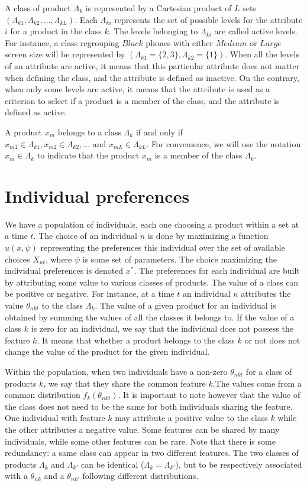 \documentclass[12pt]{article}
\begin{document}
A class of product $\Lambda_k$ is represented by a Cartesian product of $L$ sets $(\Lambda_{k1},\Lambda_{k2},\ldots,\Lambda_{kL})$. Each $\Lambda_{ki}$ represents the set of possible levels for the attribute $i$ for a product in the class $k$. The levels belonging to $\Lambda_{ki}$ are called active levels. For instance, a class regrouping $Black$ phones with either $Medium \text{ or } Large$ screen size will be represented by $(\Lambda_{k1}=\{2,3\},\Lambda_{k2}=\{1\})$. When all the levels of an attribute are active, it means that this particular attribute does not matter when defining the class, and the attribute is defined as inactive. On the contrary, when only some levels are active, it means that the attribute is used as a criterion to select if a product is a member of the class, and the attribute is defined as active.

A product $x_m$ belongs to a class $\Lambda_k$ if and only if $ x_{m1} \in \Lambda_{k1},x_{m2} \in \Lambda_{k2},\ldots \text{ and } x_{mL} \in \Lambda_{kL}$. For convenience, we will use the notation $x_{m} \in \Lambda_{k}$ to indicate that the product $x_{m}$ is a member of the class $\Lambda_{k}$.

\section{Individual preferences}

We have a population of individuals, each one choosing a product within a set at a time $t$. The choice of an individual $n$ is done by maximizing a function $u(x,\psi)$ representing the preferences this individual over the set of available choices $X_{nt}$, where $\psi$ is some set of parameters. The choice maximizing the individual preferences is denoted $x^*$. The preferences for each individual are built by attributing some value to various classes of products. The value of a class can be positive or negative. For instance, at a time $t$ an individual $n$ attributes the value $\theta_{nkt}$ to the class $\Lambda_k$. The value of a given product for an individual is obtained by summing the values of all the classes it belongs to. If the value of a class $k$ is zero for an individual, we say that the individual does not possess the feature $k$. It means that whether a product belongs to the class $k$ or not does not change the value of the product for the given individual.

Within the population, when two individuals have a non-zero $\theta_{nkt}$ for a class of products $k$, we say that they share the common feature $k$.The values come from a common distribution $f_k(\theta_{nkt})$. It is important to note however that the value of the class does not need to be the same for both individuals sharing the feature. One individual with feature $k$ may attribute a positive value to the class $k$ while the other attributes a negative value. Some features can be shared by many individuals, while some other features can be rare. 
Note that there is some redundancy: a same class can appear in two different features. The two classes of products $\Lambda_k$ and $\Lambda_{k'}$ can be identical ($\Lambda_k = \Lambda_{k'}$), but to be respectively associated with a $\theta_{nk}$ and a $\theta_{nk'}$ following different distributions.
\end{document}

